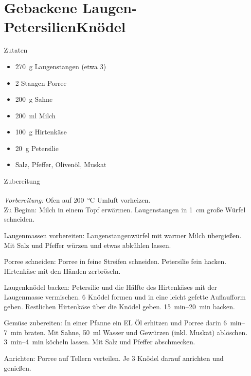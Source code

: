 \section*{Gebackene Laugen-PetersilienKnödel}
\ihead{}\ohead{}
\cfoot{}
{\Large Zutaten}
\begin{multicols}{2}
\begin{itemize}
    \item \SI{270}{g} Laugenstangen (etwa \num{3})
    \item \num{2} Stangen Porree
    \item \SI{200}{g} Sahne
    \item \SI{200}{ml} Milch
    \item \SI{100}{g} Hirtenkäse
    \item \SI{20}{g} Petersilie
    \item Salz, Pfeffer, Olivenöl, Muskat
\end{itemize}
\end{multicols}
\noindent
{\Large Zubereitung}\\
\\
\textit{Vorbereitung:} Ofen auf \SI{200}{\celsius} Umluft vorheizen.\\
Zu Beginn: Milch in einem Topf erwärmen. 
Laugenstangen in \SI{1}{cm} große Würfel schneiden. 

Laugenmassen vorbereiten: Laugenstangenwürfel mit warmer Milch übergießen. 
Mit Salz und Pfeffer würzen und etwas abkühlen lassen. 

Porree schneiden: Porree in feine Streifen schneiden. 
Petersilie fein hacken. 
Hirtenkäse mit den Händen zerbröseln. 

Laugenknödel backen: Petersilie und die Hälfte des Hirtenkäses mit der Laugenmasse vermischen.
\num{6} Knödel formen und in eine leicht gefette Auflaufform geben. 
Restlichen Hirtenkäse über die Knödel geben.
\SIrange{15}{20}{min} backen.

Gemüse zubereiten: In einer Pfanne ein EL Öl erhitzen und Porree darin \SIrange{6}{7}{min} braten. 
Mit Sahne, \SI{50}{ml} Wasser und Gewürzen (inkl. Muskat) ablöschen. 
\SIrange{3}{4}{min} köcheln lassen. 
Mit Salz und Pfeffer abschmecken. 

Anrichten: Porree auf Tellern verteilen. 
Je \num{3} Knödel darauf anrichten und genießen. 